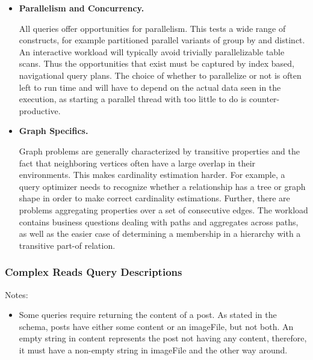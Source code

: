 \begin{itemize}
    \item \textbf{Parallelism and Concurrency.}

        All queries offer opportunities for parallelism.  This tests a wide
        range of constructs, for example partitioned parallel variants of
        group by and distinct.  An interactive workload will typically avoid
        trivially parallelizable table scans.  Thus the opportunities that
        exist must be captured by index based, navigational query plans.  The
        choice of whether to parallelize or not is often left to run time and
        will have to depend on the actual data seen in the execution, as
        starting a parallel thread with too little to do is
        counter-productive.


    \item \textbf{Graph Specifics.}

        Graph problems are generally characterized by transitive properties
        and the fact that neighboring vertices often have a large overlap in
        their environments.  This makes cardinality estimation harder.  For
        example, a query optimizer needs to recognize whether a relationship
        has a tree or graph shape in order to make correct cardinality
        estimations.  Further, there are problems aggregating properties over
        a set of consecutive edges.  The workload contains business questions
        dealing with paths and aggregates across paths, as well as the easier
        case of determining a membership in a hierarchy with a transitive
        part-of relation.
\end{itemize}
\subsubsection{Complex Reads Query Descriptions}
\label{sub:queries}

Notes:
\begin{itemize}
    \item Some queries require returning the content of a post. As stated in the
        schema, posts have either some content or an imageFile, but not both. An empty string in
        content represents the post not having any content, therefore, it must have a
        non-empty string in imageFile and the other way around.
\end{itemize}

